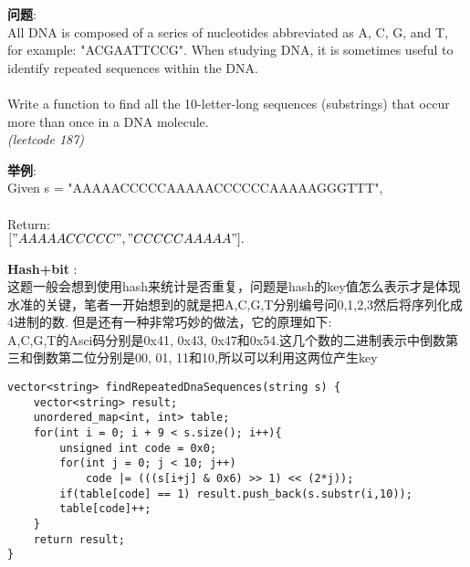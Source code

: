    
\begin{description}
    \item{\textbf{问题}}:\\
All DNA is composed of a series of nucleotides abbreviated as A, C, G, and T, for example: "ACGAATTCCG". When studying DNA, it is sometimes useful to identify repeated sequences within the DNA.\\
\\
Write a function to find all the 10-letter-long sequences (substrings) that occur more than once in a DNA molecule.\\
 \textit{(leetcode 187)}

    \item{\textbf{举例}}:\\
Given s = "AAAAACCCCCAAAAACCCCCCAAAAAGGGTTT",\\
\\
Return:\\
$["AAAAACCCCC", "CCCCCAAAAA"].$
    \item{\textbf{Hash+bit}} : 
    \\这题一般会想到使用hash来统计是否重复，问题是hash的key值怎么表示才是体现水准的关键，笔者一开始想到的就是把A,C,G,T分别编号问0,1,2,3然后将序列化成4进制的数. 但是还有一种非常巧妙的做法，它的原理如下:\\
	A,C,G,T的Asci码分别是0x41, 0x43, 0x47和0x54.这几个数的二进制表示中倒数第三和倒数第二位分别是00, 01, 11和10,所以可以利用这两位产生key
    \begin{lstlisting}
vector<string> findRepeatedDnaSequences(string s) {
	vector<string> result;
	unordered_map<int, int> table;
	for(int i = 0; i + 9 < s.size(); i++){
		unsigned int code = 0x0;
		for(int j = 0; j < 10; j++)
			code |= (((s[i+j] & 0x6) >> 1) << (2*j));
		if(table[code] == 1) result.push_back(s.substr(i,10));
		table[code]++;
	}
	return result;
}
    \end{lstlisting}
\end{description}
